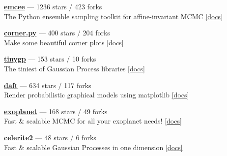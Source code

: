 \item \href{https://github.com/dfm/emcee}{{\bf emcee}} --- 1236 stars / 423 forks \\
The Python ensemble sampling toolkit for affine-invariant MCMC \href{https://emcee.readthedocs.io}{[docs]}

\item \href{https://github.com/dfm/corner.py}{{\bf corner.py}} --- 400 stars / 204 forks \\
Make some beautiful corner plots \href{http://corner.readthedocs.io}{[docs]}

\item \href{https://github.com/dfm/tinygp}{{\bf tinygp}} --- 153 stars / 10 forks \\
The tiniest of Gaussian Process libraries \href{https://tinygp.readthedocs.io}{[docs]}

\item \href{https://github.com/daft-dev/daft}{{\bf daft}} --- 634 stars / 117 forks \\
Render probabilistic graphical models using matplotlib \href{https://docs.daft-pgm.org}{[docs]}

\item \href{https://github.com/exoplanet-dev/exoplanet}{{\bf exoplanet}} --- 168 stars / 49 forks \\
Fast {\&} scalable MCMC for all your exoplanet needs!  \href{https://docs.exoplanet.codes}{[docs]}

\item \href{https://github.com/exoplanet-dev/celerite2}{{\bf celerite2}} --- 48 stars / 6 forks \\
Fast {\&} scalable Gaussian Processes in one dimension \href{https://celerite2.readthedocs.io}{[docs]}